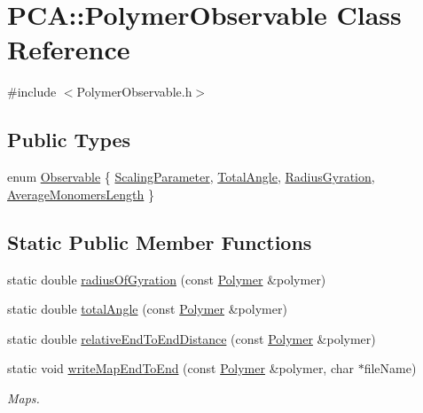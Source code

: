 \hypertarget{class_p_c_a_1_1_polymer_observable}{}\section{P\+CA\+:\+:Polymer\+Observable Class Reference}
\label{class_p_c_a_1_1_polymer_observable}


{\ttfamily \#include $<$Polymer\+Observable.\+h$>$}

\subsection*{Public Types}
\begin{DoxyCompactItemize}
\item 
enum \hyperlink{class_p_c_a_1_1_polymer_observable_a6dcabbc3bc249018c2c94825bff2c94f}{Observable} \{ \hyperlink{class_p_c_a_1_1_polymer_observable_a6dcabbc3bc249018c2c94825bff2c94fa0fbc808b6c1b04cd6cd30808354f2ac4}{Scaling\+Parameter}, 
\hyperlink{class_p_c_a_1_1_polymer_observable_a6dcabbc3bc249018c2c94825bff2c94fa9cc0a0c7f637afc18b27c94757dda4b9}{Total\+Angle}, 
\hyperlink{class_p_c_a_1_1_polymer_observable_a6dcabbc3bc249018c2c94825bff2c94fadeaff576492062c0c633ff9868907b43}{Radius\+Gyration}, 
\hyperlink{class_p_c_a_1_1_polymer_observable_a6dcabbc3bc249018c2c94825bff2c94fa9c3d1e4ed76d2bf6a991772bb58c7c1e}{Average\+Monomers\+Length}
 \}
\end{DoxyCompactItemize}
\subsection*{Static Public Member Functions}
\begin{DoxyCompactItemize}
\item 
static double \hyperlink{class_p_c_a_1_1_polymer_observable_a4c86e883bb2cede01b67263f00ab427c}{radius\+Of\+Gyration} (const \hyperlink{class_p_c_a_1_1_polymer}{Polymer} \&polymer)
\item 
static double \hyperlink{class_p_c_a_1_1_polymer_observable_ae5b2dbf1d87aa54347f2a66bfb24e78b}{total\+Angle} (const \hyperlink{class_p_c_a_1_1_polymer}{Polymer} \&polymer)
\item 
static double \hyperlink{class_p_c_a_1_1_polymer_observable_a72ff49d3aed6660b0bd7a8175f3b436e}{relative\+End\+To\+End\+Distance} (const \hyperlink{class_p_c_a_1_1_polymer}{Polymer} \&polymer)
\item 
static void \hyperlink{class_p_c_a_1_1_polymer_observable_ac63e1b37da93eca84e21916f01279a59}{write\+Map\+End\+To\+End} (const \hyperlink{class_p_c_a_1_1_polymer}{Polymer} \&polymer, char $\ast$file\+Name)
\begin{DoxyCompactList}\small\item\em Maps. \end{DoxyCompactList}\end{DoxyCompactItemize}


